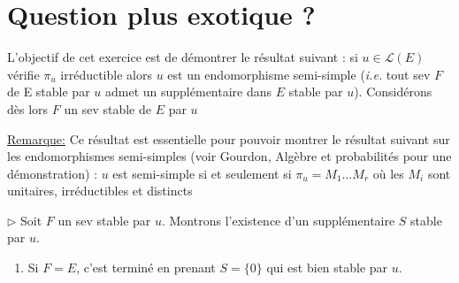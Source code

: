 \documentclass[answers,11pt]{exam}
\newcommand{\KK}{\mathbb{K}}
\begin{document}
\section{Question plus exotique ?}

\begin{questions}

\question L'objectif de cet exercice est de démontrer le résultat suivant : si $u \in \mathcal{L}(E)$ vérifie $\pi_u$ irréductible alors $u$ est un endomorphisme semi-simple (\emph{i.e.}  tout sev $F$ de E stable par $u$ admet un supplémentaire dans $E$ stable par $u$). Considérons dès lors $F$ un sev stable de $E$ par $u$
 \underline{Remarque:} Ce résultat est essentielle pour pouvoir montrer le résultat suivant sur les endomorphismes semi-simples (voir Gourdon, Algèbre et probabilités pour une démonstration) : \og $u$ est semi-simple si et seulement si $\pi_u = M_1 \dots M_r$ où les $M_i$ sont unitaires, irréductibles et distincts \fg
 
 \begin{solution}
 	    $\triangleright$ Soit $F$ un sev stable par $u$. Montrons l'existence d'un supplémentaire $S$ stable par $u$.\\
\begin{enumerate}[label=(\alph*)]
    \item  Si $F=E$, c'est terminé en prenant $S=\{0\}$ qui est bien stable par $u$.
    

\end{enumerate}
\end{solution}
\end{questions}
\end{document}

